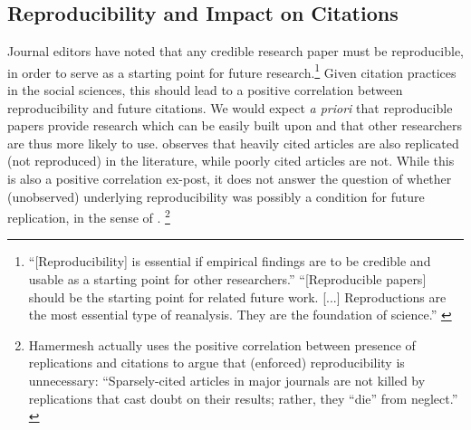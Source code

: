 
\subsection{Reproducibility and Impact on Citations}




Journal editors have noted that any credible research paper must be reproducible, in order to serve as a starting point for future research.\footnote{
	``[Reproducibility] is essential if empirical findings are to be credible and usable as a starting point for other researchers.'' \citep{bernanke2004}
%
	``[Reproducible papers]  should be the starting point for related future work. [...] Reproductions are the most essential type of reanalysis. They are the foundation of science.'' \citep{welch2019c}}
%
Given citation practices in the social sciences, this should lead to a positive correlation between reproducibility and future citations. We would expect \textit{a priori} that reproducible papers provide research which can be easily built upon and that other researchers are thus more likely to use.  \citet{Hamermesh2007} observes that heavily cited articles are also replicated (not reproduced) in the literature, while poorly cited articles are not. While this is also a positive correlation ex-post, it does not answer the question of whether (unobserved) underlying reproducibility was possibly a condition for future replication, in the sense of \citet{bernanke2004}.%
%
\footnote{Hamermesh actually uses the positive correlation between presence of replications and citations to argue that (enforced) reproducibility is unnecessary: 
	``Sparsely-cited articles in major journals
	are not killed by replications that cast doubt on
	their results; rather, they ``die'' from neglect.'' \citep{Hamermesh2017}}
%




